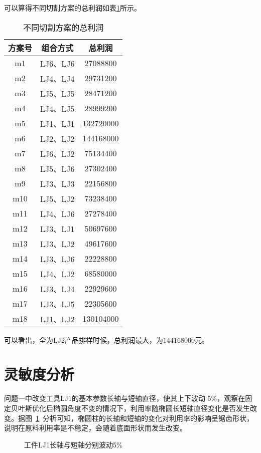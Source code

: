 \documentclass{whutmod}
\begin{document}
  	可以算得不同切割方案的总利润如表\ref{sgzai}所示。
	\begin{table}[H]
		\centering		
		\caption{不同切割方案的总利润}\label{sgzai}
		\begin{tabular}{ccc}
			\toprule[2pt]
			\multicolumn{1}{m{3cm}}{\centering 方案号}
			& \multicolumn{1}{m{4cm}}{\centering 组合方式}
			& \multicolumn{1}{m{4cm}}{\centering 总利润}\\
			\midrule[1pt]
			m1 &  LJ6、LJ6&27088800\\ 
			m2 &  LJ4、LJ4&29731200\\ 
			m3 &  LJ5、LJ5&28471200\\ 
			m4 &  LJ4、LJ5&28999200\\ 
			m5 &  LJ1、LJ1&132720000\\ 
			m6 &  LJ2、LJ2&144168000\\ 
			m7 &  LJ6、LJ2&75134400\\ 
			m8 &  LJ5、LJ6&27302400\\ 
			m9 &  LJ3、LJ3&22156800\\ 
			m10 &  LJ5、LJ2&73238400\\ 
			m11 &  LJ4、LJ6&27278400\\ 
			m12 &  LJ3、LJ1&50697600\\ 
			m13 &  LJ3、LJ2&49617600\\ 
			m14 &  LJ3、LJ6&22228800	\\ 
			m15 &  LJ4、LJ2&68580000\\ 
			m16 &  LJ3、LJ4&22929600\\ 
			m17 &  LJ3、LJ5&22305600\\ 
			m18 &  LJ1、LJ2&130104000\\ 
			\bottomrule[2pt]	
		\end{tabular}
	\end{table}
	可以看出，全为LJ2产品排样时候，总利润最大，为$144168000$元。
  	\section{灵敏度分析}
  	问题一中改变工具LJ1的基本参数长轴与短轴直径，使其上下波动 5\%，观察在固定贝叶斯优化后椭圆角度不变的情况下，利用率随椭圆长短轴直径变化是否发生改变。据图~\ref{adad}~分析可知，椭圆柱的长轴和短轴的变化对利用率的影响呈锯齿形状，说明在原料利用率是不稳定，会随着底面形状而发生改变。
  	
   \begin{figure}[H]
 	\centering
 	\caption{工件LJ1长轴与短轴分别波动5\%}\label{adad}
 \end{figure}
   	
\end{document}
